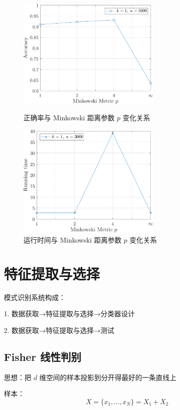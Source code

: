 \documentclass[openany]{ctexbook}
\theoremstyle{kaiti}
\theoremstyle{normal}
\begin{document}
\begin{figure}[htbp]
  \centering
  \begin{minipage}[t]{0.48\textwidth}
    \centering
    \includegraphics[width=7cm]{pAccuracy.pdf}
    \caption{正确率与 Minkowski 距离参数 $p$ 变化关系}
    \label{fig:pAccuracy}
  \end{minipage}
  \begin{minipage}[t]{0.48\textwidth}
    \centering
    \includegraphics[width=7cm]{pTime.pdf}
    \caption{运行时间与 Minkowski 距离参数 $p$ 变化关系}
    \label{fig:pTime}
  \end{minipage}
\end{figure}

\chapter{特征提取与选择}

模式识别系统构成：

1. 数据获取→特征提取与选择→分类器设计

2. 数据获取→特征提取与选择→测试

\section{Fisher 线性判别}

思想：把 $d$ 维空间的样本投影到分开得最好的一条直线上

样本：
\begin{equation}
X=\{ x_1,\dots,x_N\} =X_1+X_2
\end{equation}
\end{document}
